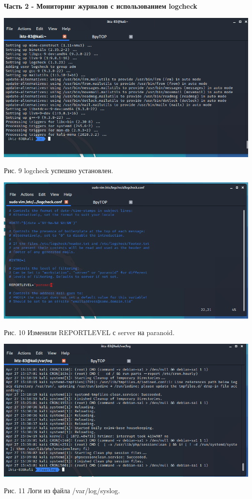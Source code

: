 \documentclass[a4paper,14pt]{extarticle}
\begin{document}
    \newpage
    \textbf{Часть 2 - Мониторинг журналов с использованием logcheck}
    \begin{center}

        \includegraphics[scale=0.5]{pics/9.png}

        Рис. 9 logcheck успешно установлен. 
        \vspace{1ex}

        \includegraphics[scale=0.5]{pics/10.png}

        Рис. 10 Изменили REPORTLEVEL с server на paranoid.
        \vspace{1ex}

        \includegraphics[scale=0.5]{pics/11.png}

        Рис. 11  Логи из файла /var/log/syslog.
        \vspace{1ex}

   \end{center}
\end{document}
